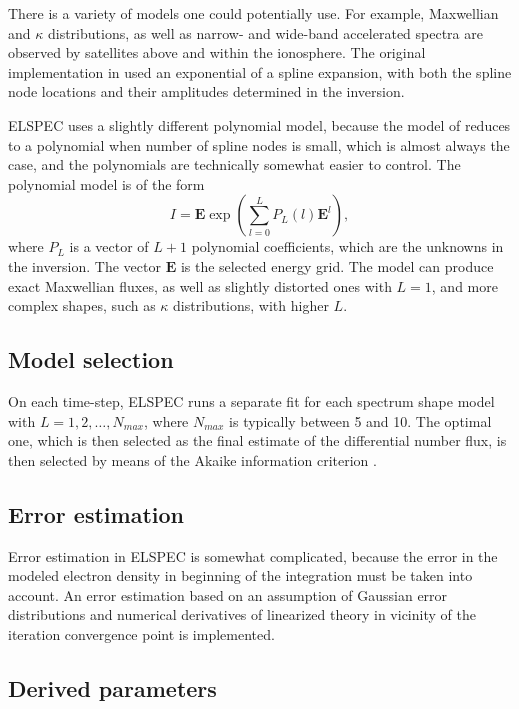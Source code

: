 \documentclass[12pt,a4paper]{report}
\begin{document}
There is a variety of models one could potentially use. For example, Maxwellian and $\kappa$ distributions, as well as narrow- and wide-band accelerated spectra  are observed by satellites above and within the ionosphere. The original implementation in \cite{dahlgren2011} used an exponential of a spline expansion, with both the spline node locations and their amplitudes determined in the inversion. 

ELSPEC uses a slightly different polynomial model, because the model of \cite{dahlgren2011} reduces to a polynomial when number of spline nodes is small, which is almost always the case, and the polynomials are technically somewhat easier to control. The polynomial model is of the form
\begin{equation}
I = \bm{E}\exp{\left(\sum_{l=0}^L{P_L(l)\bm{E}^l}\right)},
\end{equation}
where $P_L$ is a vector of $L+1$ polynomial coefficients, which are the unknowns in the inversion. The vector $\bm{E}$ is the selected energy grid. The model can produce exact Maxwellian fluxes, as well as slightly distorted ones with $L=1$, and more complex shapes, such as $\kappa$ distributions, with higher $L$.

\subsection{Model selection}

On each time-step, ELSPEC runs a separate fit for each spectrum shape model with $L=1,2,\ldots,N_{max}$, where $N_{max}$ is typically between 5 and 10. The optimal one, which is then selected as the final estimate of the differential number flux, is then selected by means of the Akaike information criterion \citep[e.g.][]{burnham2002}.


\subsection{Error estimation}

Error estimation in ELSPEC is somewhat complicated, because the error in the modeled electron density in beginning of the integration must be taken into account. An error estimation based on an assumption of Gaussian error distributions and numerical derivatives of linearized theory in vicinity of the iteration convergence point is implemented. 

\subsection{Derived parameters}
\end{document}
